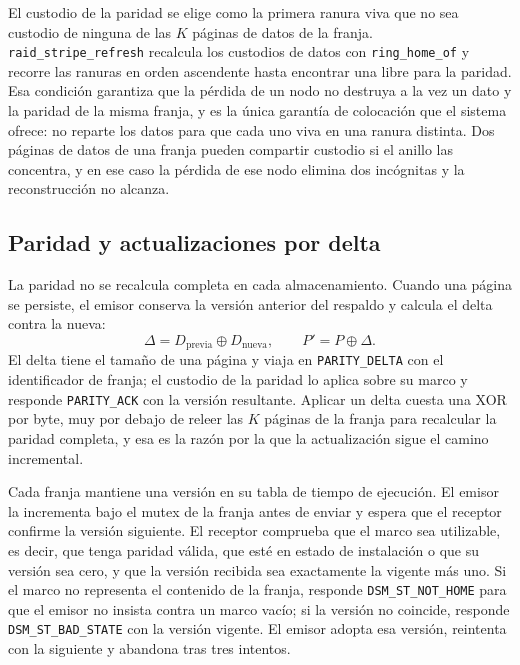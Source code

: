 El custodio de la paridad se elige como la primera ranura viva que no sea custodio de ninguna de las $K$ páginas de datos de la franja. \texttt{raid\_stripe\_refresh} recalcula los custodios de datos con \texttt{ring\_home\_of} y recorre las ranuras en orden ascendente hasta encontrar una libre para la paridad. Esa condición garantiza que la pérdida de un nodo no destruya a la vez un dato y la paridad de la misma franja, y es la única garantía de colocación que el sistema ofrece: no reparte los datos para que cada uno viva en una ranura distinta. Dos páginas de datos de una franja pueden compartir custodio si el anillo las concentra, y en ese caso la pérdida de ese nodo elimina dos incógnitas y la reconstrucción no alcanza.


\subsection{Paridad y actualizaciones por delta}

La paridad no se recalcula completa en cada almacenamiento. Cuando una página se persiste, el emisor conserva la versión anterior del respaldo y calcula el delta contra la nueva:
\begin{equation}
\Delta = D_{\text{previa}} \oplus D_{\text{nueva}}, \qquad P' = P \oplus \Delta.
\end{equation}
El delta tiene el tamaño de una página y viaja en \texttt{PARITY\_DELTA} con el identificador de franja; el custodio de la paridad lo aplica sobre su marco y responde \texttt{PARITY\_ACK} con la versión resultante. Aplicar un delta cuesta una XOR por byte, muy por debajo de releer las $K$ páginas de la franja para recalcular la paridad completa, y esa es la razón por la que la actualización sigue el camino incremental.

Cada franja mantiene una versión en su tabla de tiempo de ejecución. El emisor la incrementa bajo el mutex de la franja antes de enviar y espera que el receptor confirme la versión siguiente. El receptor comprueba que el marco sea utilizable, es decir, que tenga paridad válida, que esté en estado de instalación o que su versión sea cero, y que la versión recibida sea exactamente la vigente más uno. Si el marco no representa el contenido de la franja, responde \texttt{DSM\_ST\_NOT\_HOME} para que el emisor no insista contra un marco vacío; si la versión no coincide, responde \texttt{DSM\_ST\_BAD\_STATE} con la versión vigente. El emisor adopta esa versión, reintenta con la siguiente y abandona tras tres intentos.

